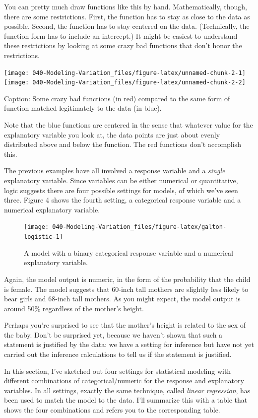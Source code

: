 \documentclass[]{book}
\begin{document}
You can pretty much draw functions like this by hand. Mathematically, though, there are some restrictions. First, the function has to stay as close to the data as possible. Second, the function has to stay centered on the data. (Technically, the function form has to include an intercept.) It might be easiest to understand these restrictions by looking at some crazy bad functions that don't honor the restrictions.

\texttt{[image: 040-Modeling-Variation\_files/figure-latex/unnamed-chunk-2-1]} \texttt{[image: 040-Modeling-Variation\_files/figure-latex/unnamed-chunk-2-2]}

Caption: Some crazy bad functions (in red) compared to the same form of function matched legitimately to the data (in blue).

Note that the blue functions are centered in the sense that whatever value for the explanatory variable you look at, the data points are just about evenly distributed above and below the function. The red functions don't accomplish this.

The previous examples have all involved a response variable and a \emph{single} explanatory variable. Since variables can be either numerical or quantitative, logic suggests there are four possible settings for models, of which we've seen three. Figure 4 shows the fourth setting, a categorical response variable and a numerical explanatory variable.

\begin{figure}\texttt{[image: 040-Modeling-Variation\_files/figure-latex/galton-logistic-1]} \caption{A model with a binary categorical response variable and a numerical explanatory variable.}\label{fig:galton-logistic}
\end{figure}

Again, the model output is numeric, in the form of the probability that the child is female. The model suggests that 60-inch tall mothers are slightly less likely to bear girls and 68-inch tall mothers. As you might expect, the model output is around 50\% regardless of the mother's height.

Perhaps you're surprised to see that the mother's height is related to the sex of the baby. Don't be surprised yet, because we haven't shown that such a statement is justified by the data: we have a setting for inference but have not yet carried out the inference calculations to tell us if the statement is justified.

In this section, I've sketched out four settings for statistical modeling with different combinations of categorical/numeric for the response and explanatory variables. In all settings, exactly the same technique, called \emph{linear regression}, has been used to match the model to the data. I'll summarize this with a table that shows the four combinations and refers you to the corresponding table.
\end{document}
